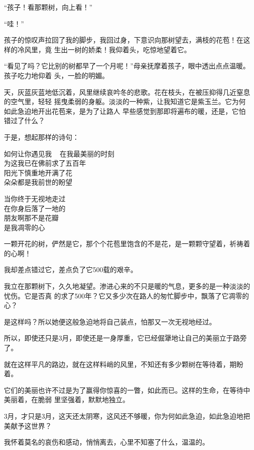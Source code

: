 \documentclass[12pt,a4paper]{article}
\begin{document}
		“孩子！看那颗树，向上看！”

		“哇！”

		孩子的惊叹声拉回了我的脚步，我回过身，下意识向那树望去，满枝的花苞！在这样的冷风里，竟
	生出一树的娇柔！我仰着头，吃惊地望着它。

		“看见了吗？它比别的树都早了一个月呢！”母亲抚摩着孩子，眼中透出点点温暖。孩子吃力地仰着
	头，一脸的明媚。

		天，灰蓝灰蓝地低沉着，风里继续哀吟冬的悲歌。花在枝头，在被压抑得几近窒息的空气里，轻轻
	摇曳柔弱的身躯。淡淡的一种紫，让我知道它是紫玉兰。它为何如此急迫地开出花苞来，是为了让路人
	早些感觉到那即将遍布的暖，还是，它怕错过了什么？

		于是，想起那样的诗句：

		\longpoem{}{}{}
		如何让你遇见我 ~ 在我最美丽的时刻 \\
		为这我已在佛前求了五百年 \\
		阳光下慎重地开满了花 \\
		朵朵都是我前世的盼望

		当你终于无视地走过 \\
		在你身后落了一地的 \\
		朋友啊那不是花瓣 \\
		是我凋零的心
		\endlongpoem

		一颗开花的树，俨然是它，那个个花苞里饱含的不是花，是一颗颗守望着，祈祷着的心啊！

		我却差点错过它，差点负了它500载的艰辛。

		我立在那颗树下，久久地凝望。渗进心来的不只是暖的气息，更多的是一种淡淡的忧伤。它是否真
	的求了500年？它又多少次在路人的匆忙脚步中，飘落了它凋零的心？

		是这样吗？所以她便这般急迫地将自己装点，怕那又一次无视地经过。

		所以，即使还只是3月，即使还是一身厚重，它已经倔犟地让自己的美丽立于路旁了。

		就在这样平凡的路边，就在这样料峭的风里，不知还有多少颗树在等待着，期盼着。

		它们的美丽也许不过是为了赢得你惊喜的一瞥，如此而已。这样的生命，在等待中美丽着，在脆弱
	里坚强着，默默地独立。

		3月，才只是3月，这天还太阴寒，这风还不够暖，你为何如此急迫，如此急迫地把美献予这世界？

		我怀着莫名的哀伤和感动，悄悄离去，心里不知塞了什么，温温的。

	\endwriting


\end{document}
